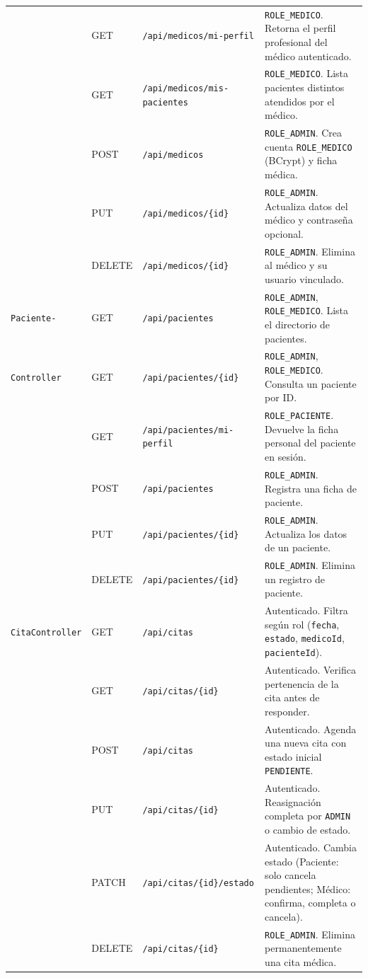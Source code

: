 \documentclass{article}
\begin{document}
\begin{table}[H]
\begin{tabularx}{\textwidth}{@{} l l l X @{}}
& GET & \texttt{/api/medicos/mi-perfil} & \texttt{ROLE\_MEDICO}. Retorna el perfil profesional del médico autenticado. \\
& GET & \texttt{/api/medicos/mis-pacientes} & \texttt{ROLE\_MEDICO}. Lista pacientes distintos atendidos por el médico. \\
& POST & \texttt{/api/medicos} & \texttt{ROLE\_ADMIN}. Crea cuenta \texttt{ROLE\_MEDICO} (BCrypt) y ficha médica. \\
& PUT & \texttt{/api/medicos/\{id\}} & \texttt{ROLE\_ADMIN}. Actualiza datos del médico y contraseña opcional. \\
& DELETE & \texttt{/api/medicos/\{id\}} & \texttt{ROLE\_ADMIN}. Elimina al médico y su usuario vinculado. \\
\midrule
\texttt{Paciente-} & GET & \texttt{/api/pacientes} & \texttt{ROLE\_ADMIN}, \texttt{ROLE\_MEDICO}. Lista el directorio de pacientes. \\
\texttt{Controller} & GET & \texttt{/api/pacientes/\{id\}} & \texttt{ROLE\_ADMIN}, \texttt{ROLE\_MEDICO}. Consulta un paciente por ID. \\
& GET & \texttt{/api/pacientes/mi-perfil} & \texttt{ROLE\_PACIENTE}. Devuelve la ficha personal del paciente en sesión. \\
& POST & \texttt{/api/pacientes} & \texttt{ROLE\_ADMIN}. Registra una ficha de paciente. \\
& PUT & \texttt{/api/pacientes/\{id\}} & \texttt{ROLE\_ADMIN}. Actualiza los datos de un paciente. \\
& DELETE & \texttt{/api/pacientes/\{id\}} & \texttt{ROLE\_ADMIN}. Elimina un registro de paciente. \\
\midrule
\texttt{CitaController} & GET & \texttt{/api/citas} & Autenticado. Filtra según rol (\texttt{fecha}, \texttt{estado}, \texttt{medicoId}, \texttt{pacienteId}). \\
& GET & \texttt{/api/citas/\{id\}} & Autenticado. Verifica pertenencia de la cita antes de responder. \\
& POST & \texttt{/api/citas} & Autenticado. Agenda una nueva cita con estado inicial \texttt{PENDIENTE}. \\
& PUT & \texttt{/api/citas/\{id\}} & Autenticado. Reasignación completa por \texttt{ADMIN} o cambio de estado. \\
& PATCH & \texttt{/api/citas/\{id\}/estado} & Autenticado. Cambia estado (Paciente: solo cancela pendientes; Médico: confirma, completa o cancela). \\
& DELETE & \texttt{/api/citas/\{id\}} & \texttt{ROLE\_ADMIN}. Elimina permanentemente una cita médica. \\
\bottomrule
\end{tabularx}
\end{table}
\end{document}
